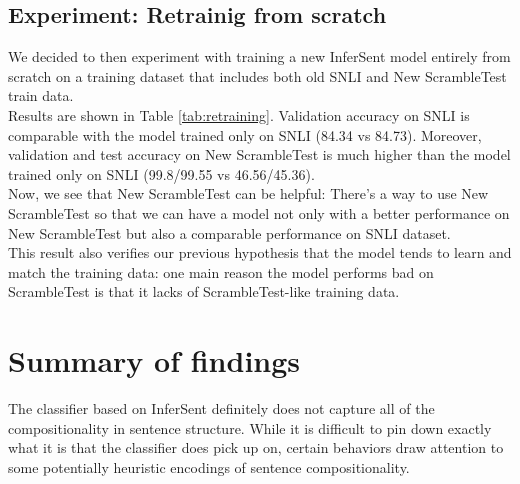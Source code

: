 \documentclass[10pt,letterpaper]{article}
\begin{document}
\subsection{Experiment: Retrainig from scratch}
We decided to then experiment with training a new InferSent model entirely from scratch on a training dataset that includes both old SNLI and New ScrambleTest train data.\\
Results are shown in Table \ref{tab:retraining}. Validation accuracy on SNLI is comparable with the model trained only on SNLI (84.34 vs 84.73). Moreover, validation and test accuracy on New ScrambleTest is much higher than the model trained only on SNLI (99.8/99.55 vs 46.56/45.36).\\
Now, we see that New ScrambleTest can be helpful: There's a way to use New ScrambleTest so that we can have a model not only with a better performance on New ScrambleTest but also a comparable performance on SNLI dataset.\\
This result also verifies our previous hypothesis that the model tends to learn and match the training data: one main reason the model performs bad on ScrambleTest is that it lacks of ScrambleTest-like training data.\\


\begin{table}[htb]
 \caption{Experiment: Retraining From Scratch}
  \label{tab:retraining}
\end{table}



\section{Summary of findings}
The classifier based on InferSent definitely does not capture all of the compositionality in sentence structure. While it is difficult to pin down exactly what it is that the classifier does pick up on, certain behaviors draw attention to some potentially heuristic encodings of sentence compositionality. 
\end{document}
